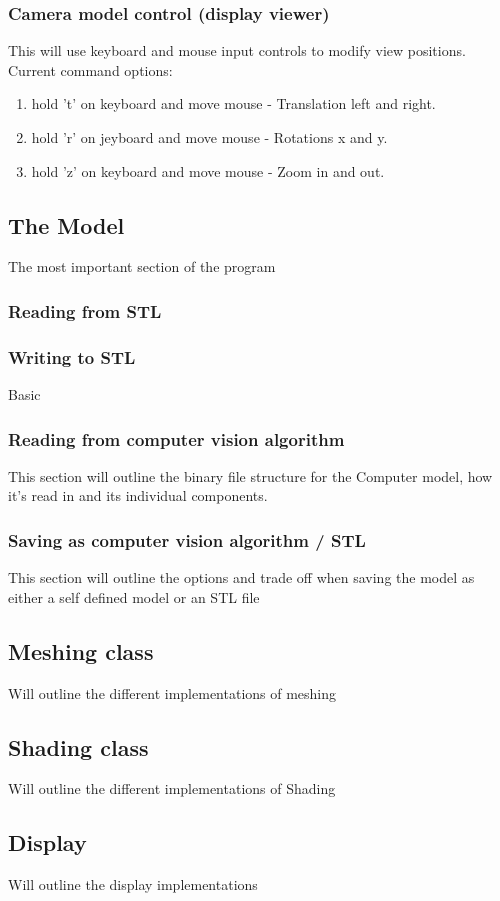 \documentclass[11pt]{article}
\begin{document}
			\subsubsection{Camera model control (display viewer)}
				This will use keyboard and mouse input controls to modify view positions.
				Current command options: 
					\begin{enumerate}
						\item hold 't' on keyboard and move mouse - Translation left and right.
						\item hold 'r' on jeyboard and move mouse - Rotations x and y. 
						\item hold 'z' on keyboard and move mouse - Zoom in and out.
					\end{enumerate}
		
		\subsection{The Model}
			The most important section of the program
			
			\subsubsection{Reading from STL} %
			\subsubsection{Writing to STL} %
				Basic 
			
			\subsubsection{Reading from computer vision algorithm} 
				This section will outline the binary file structure for the Computer model, how it's read in and its individual components. 
				
			\subsubsection{Saving as computer vision algorithm / STL} 
				This section will outline the options and trade off when saving the model as either a self defined model or an STL file
			
		\subsection{Meshing class} 
			Will outline the different implementations of meshing
		
		\subsection{Shading class} 
			Will outline the different implementations of Shading
		
		\subsection{Display} 
			Will outline the display implementations
			
			
\end{document}
